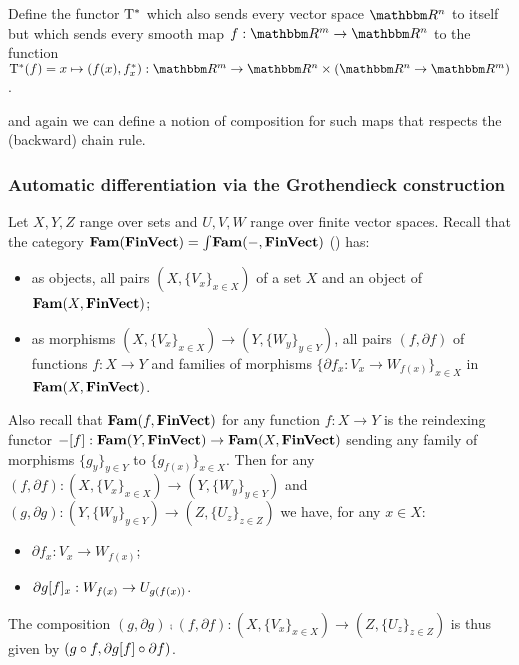 \begin{definition}
Define the functor $\mathrm{T}^*$ which also sends every vector space $\RR^n$ to itself but which sends every
smooth map $f: \RR^m \to \RR^n$ to the function $\tangents^*(f) = x \mapsto (f(x), \pullf{f}_x): \RR^m \to
\RR^n \times (\RR^n \to \RR^m)$.
\end{definition}

\noindent and again we can define a notion of composition for such maps that respects the (backward) chain
rule.

\subsubsection{Automatic differentiation via the Grothendieck construction}

Let $X, Y, Z$ range over sets and $U, V, W$ range over finite vector spaces. Recall that the category
$\mathbf{Fam}(\mathbf{FinVect}) = \int_{}\mathbf{Fam}(-, \mathbf{FinVect})$ () has:
\begin{itemize}
\item as objects, all pairs $(X, \{V_x\}_{x \in X})$ of a set $X$ and an object of $\mathbf{Fam}(X,\mathbf{FinVect})$;
\item as morphisms $(X, \{V_x\}_{x \in X}) \to (Y, \{W_y\}_{y \in Y})$, all pairs $(f, \partial f)$ of
functions $f: X \to Y$ and families of morphisms $\{\partial f_x: V_x \to W_{f(x)}\}_{x \in X}$
in $\mathbf{Fam}(X,\mathbf{FinVect})$.
\end{itemize}

Also recall that $\mathbf{Fam}(f, \mathbf{FinVect})$ for any function $f: X \to Y$ is the reindexing functor $-[f]:
\mathbf{Fam}(Y, \mathbf{FinVect}) \to \mathbf{Fam}(X, \mathbf{FinVect})$ sending any family of morphisms $\{g_y\}_{y \in Y}$ to
$\{g_{f(x)}\}_{x \in X}$. Then for any $(f, \partial f): (X, \{V_x\}_{x \in X}) \to (Y, \{W_y\}_{y \in Y})$
and $(g, \partial g): (Y, \{W_y\}_{y \in Y}) \to (Z, \{U_z\}_{z \in Z})$ we have, for any $x \in X$:
\begin{itemize}
\item $\partial f_x: V_x \to W_{f(x)}$;
\item $\partial g[f]_x: W_{f(x)} \to U_{g(f(x))}$.
\end{itemize}

\noindent The composition $(g, \partial g) \comp (f, \partial f): (X, \{V_x\}_{x \in X}) \to (Z, \{U_z\}_{z
\in Z})$ is thus given by $(g \circ f, \partial g[f] \circ \partial f)$.
